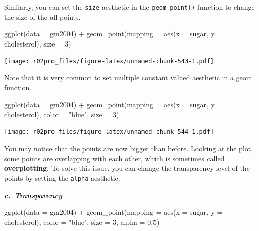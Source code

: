 \documentclass[
]{book}
\newenvironment{Shaded}{\begin{snugshade}}{\end{snugshade}}
\newcommand{\AttributeTok}[1]{\textcolor[rgb]{0.77,0.63,0.00}{#1}}
\newcommand{\DecValTok}[1]{\textcolor[rgb]{0.00,0.00,0.81}{#1}}
\newcommand{\FloatTok}[1]{\textcolor[rgb]{0.00,0.00,0.81}{#1}}
\newcommand{\FunctionTok}[1]{\textcolor[rgb]{0.00,0.00,0.00}{#1}}
\newcommand{\NormalTok}[1]{#1}
\newcommand{\SpecialCharTok}[1]{\textcolor[rgb]{0.00,0.00,0.00}{#1}}
\newcommand{\StringTok}[1]{\textcolor[rgb]{0.31,0.60,0.02}{#1}}
\begin{document}
Similarly, you can set the \texttt{size} aesthetic in the \texttt{geom\_point()} function to change the size of the all points.

\begin{Shaded}
\begin{Highlighting}[]
\FunctionTok{ggplot}\NormalTok{(}\AttributeTok{data =}\NormalTok{ gm2004) }\SpecialCharTok{+} 
  \FunctionTok{geom\_point}\NormalTok{(}\AttributeTok{mapping =} \FunctionTok{aes}\NormalTok{(}\AttributeTok{x =}\NormalTok{ sugar, }\AttributeTok{y =}\NormalTok{ cholesterol),}
             \AttributeTok{size =} \DecValTok{3}\NormalTok{)}
\end{Highlighting}
\end{Shaded}

\texttt{[image: r02pro\_files/figure-latex/unnamed-chunk-543-1.pdf]}

Note that it is very common to set multiple constant valued aesthetic in a geom function.

\begin{Shaded}
\begin{Highlighting}[]
\FunctionTok{ggplot}\NormalTok{(}\AttributeTok{data =}\NormalTok{ gm2004) }\SpecialCharTok{+} 
  \FunctionTok{geom\_point}\NormalTok{(}\AttributeTok{mapping =} \FunctionTok{aes}\NormalTok{(}\AttributeTok{x =}\NormalTok{ sugar, }\AttributeTok{y =}\NormalTok{ cholesterol),}
             \AttributeTok{color =} \StringTok{"blue"}\NormalTok{,}
             \AttributeTok{size =} \DecValTok{3}\NormalTok{)}
\end{Highlighting}
\end{Shaded}

\texttt{[image: r02pro\_files/figure-latex/unnamed-chunk-544-1.pdf]}

You may notice that the points are now bigger than before. Looking at the plot, some points are overlapping with each other, which is sometimes called \textbf{overplotting}. To solve this issue, you can change the transparency level of the points by setting the \texttt{alpha} aesthetic.

\textbf{\emph{c.~Transparency}}

\begin{Shaded}
\begin{Highlighting}[]
\FunctionTok{ggplot}\NormalTok{(}\AttributeTok{data =}\NormalTok{ gm2004) }\SpecialCharTok{+} 
  \FunctionTok{geom\_point}\NormalTok{(}\AttributeTok{mapping =} \FunctionTok{aes}\NormalTok{(}\AttributeTok{x =}\NormalTok{ sugar, }\AttributeTok{y =}\NormalTok{ cholesterol),}
             \AttributeTok{color =} \StringTok{"blue"}\NormalTok{,}
             \AttributeTok{size =} \DecValTok{3}\NormalTok{, }
             \AttributeTok{alpha =} \FloatTok{0.5}\NormalTok{)}
\end{Highlighting}
\end{Shaded}
\end{document}
